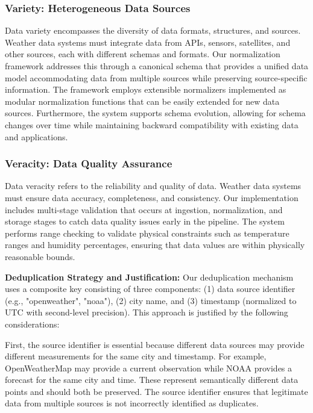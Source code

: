 \documentclass[12pt,a4paper]{article}
\begin{document}
\subsubsection{Variety: Heterogeneous Data Sources}

Data variety encompasses the diversity of data formats, structures, and sources. Weather data systems must integrate data from APIs, sensors, satellites, and other sources, each with different schemas and formats. Our normalization framework addresses this through a canonical schema that provides a unified data model accommodating data from multiple sources while preserving source-specific information. The framework employs extensible normalizers implemented as modular normalization functions that can be easily extended for new data sources. Furthermore, the system supports schema evolution, allowing for schema changes over time while maintaining backward compatibility with existing data and applications.

\subsubsection{Veracity: Data Quality Assurance}

Data veracity refers to the reliability and quality of data. Weather data systems must ensure data accuracy, completeness, and consistency. Our implementation includes multi-stage validation that occurs at ingestion, normalization, and storage stages to catch data quality issues early in the pipeline. The system performs range checking to validate physical constraints such as temperature ranges and humidity percentages, ensuring that data values are within physically reasonable bounds. 

\textbf{Deduplication Strategy and Justification:} Our deduplication mechanism uses a composite key consisting of three components: (1) data source identifier (e.g., "openweather", "noaa"), (2) city name, and (3) timestamp (normalized to UTC with second-level precision). This approach is justified by the following considerations:

First, the source identifier is essential because different data sources may provide different measurements for the same city and timestamp. For example, OpenWeatherMap may provide a current observation while NOAA provides a forecast for the same city and time. These represent semantically different data points and should both be preserved. The source identifier ensures that legitimate data from multiple sources is not incorrectly identified as duplicates.
\end{document}
